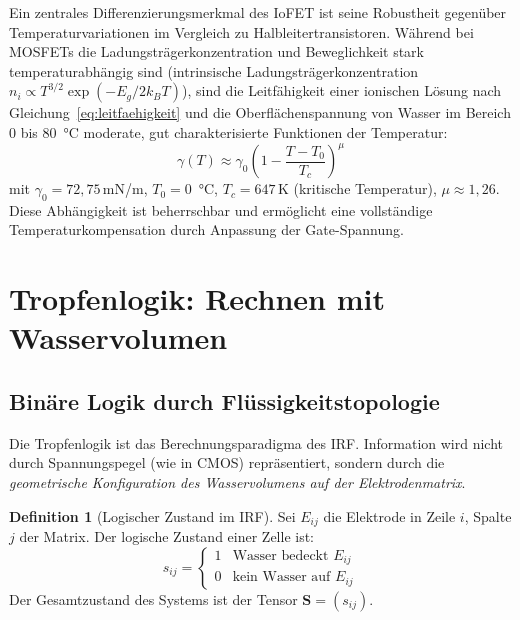 ﻿\documentclass[a4paper,12pt]{scrreprt}
\theoremstyle{definition}
\newtheorem{definition}{Definition}[section]
\begin{document}
Ein zentrales Differenzierungsmerkmal des IoFET ist seine Robustheit gegenüber
Temperaturvariationen im Vergleich zu Halbleitertransistoren. Während bei MOSFETs
die Ladungsträgerkonzentration und Beweglichkeit stark temperaturabhängig sind
(intrinsische Ladungsträgerkonzentration $n_i \propto T^{3/2} \exp(-E_g/2k_BT)$),
sind die Leitfähigkeit einer ionischen Lösung nach Gleichung~\eqref{eq:leitfaehigkeit}
und die Oberflächenspannung von Wasser im Bereich 0 bis 80\, °C moderate,
gut charakterisierte Funktionen der Temperatur:
\begin{equation}
	\gamma(T) \approx \gamma_0 \left(1 - \frac{T - T_0}{T_c}\right)^{\mu}
	\label{eq:oberflaechenspannung_temp}
\end{equation}
mit $\gamma_0 = 72{,}75$\,mN/m, $T_0 = 0$\, °C, $T_c = 647$\,K (kritische
Temperatur), $\mu \approx 1{,}26$. Diese Abhängigkeit ist beherrschbar und
ermöglicht eine vollständige Temperaturkompensation durch Anpassung der
Gate-Spannung.

\section{Tropfenlogik: Rechnen mit Wasservolumen}

\subsection{Binäre Logik durch Flüssigkeitstopologie}

Die Tropfenlogik ist das Berechnungsparadigma des IRF. Information wird nicht
durch Spannungspegel (wie in CMOS) repräsentiert, sondern durch die
\emph{geometrische Konfiguration des Wasservolumens auf der Elektrodenmatrix}.

\begin{definition}[Logischer Zustand im IRF]
	Sei $E_{ij}$ die Elektrode in Zeile $i$, Spalte $j$ der Matrix. Der
	logische Zustand einer Zelle ist:
	\begin{equation}
		s_{ij} = \begin{cases} 1 & \text{Wasser bedeckt } E_{ij} \\
			0 & \text{kein Wasser auf } E_{ij} \end{cases}
		\label{eq:logischer_zustand}
	\end{equation}
	Der Gesamtzustand des Systems ist der Tensor $\mathbf{S} = (s_{ij})$.
\end{definition}
\end{document}
